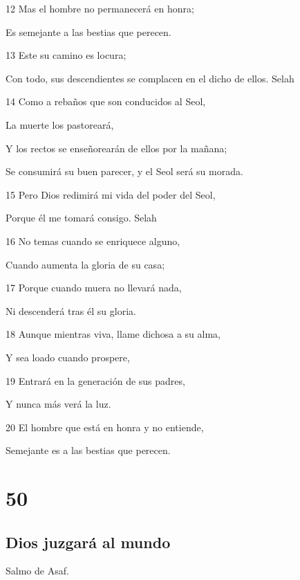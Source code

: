 \par 12 Mas el hombre no permanecerá en honra;
\par Es semejante a las bestias que perecen.
\par 13 Este su camino es locura;
\par Con todo, sus descendientes se complacen en el dicho de ellos. Selah
\par 14 Como a rebaños que son conducidos al Seol,
\par La muerte los pastoreará,
\par Y los rectos se enseñorearán de ellos por la mañana;
\par Se consumirá su buen parecer, y el Seol será su morada.
\par 15 Pero Dios redimirá mi vida del poder del Seol,
\par Porque él me tomará consigo. Selah
\par 16 No temas cuando se enriquece alguno,
\par Cuando aumenta la gloria de su casa;
\par 17 Porque cuando muera no llevará nada,
\par Ni descenderá tras él su gloria.
\par 18 Aunque mientras viva, llame dichosa a su alma,
\par Y sea loado cuando prospere,
\par 19 Entrará en la generación de sus padres,
\par Y nunca más verá la luz.
\par 20 El hombre que está en honra y no entiende,
\par Semejante es a las bestias que perecen.

\chapter{50}

\section*{Dios juzgará al mundo}

\par Salmo de Asaf.

